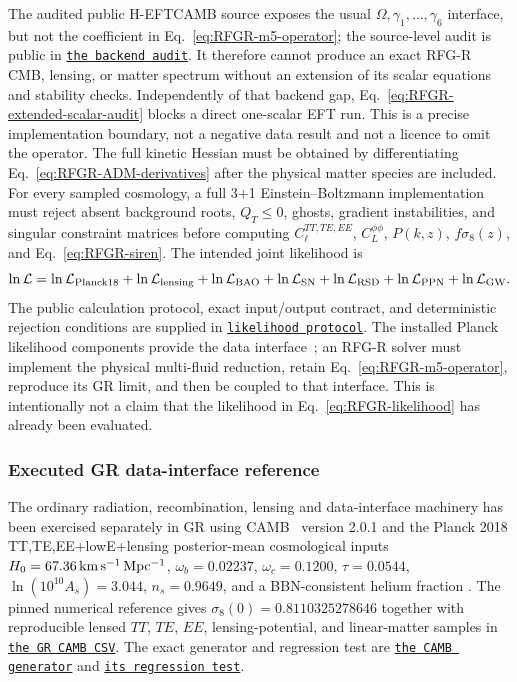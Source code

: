 \documentclass[11pt,a4paper]{article}
\newcommand{\RFGRepoURL}{https://github.com/MartinPetrasek123/MartinPetrasek123}
\newcommand{\RFGRepoNamed}[2]{\href{\RFGRepoURL/blob/main/r-universe-complete-chain/rfg-r-completion/r\_universe\_completion/#1}{\texttt{#2}}}
\begin{document}
The audited public H-EFTCAMB source exposes the usual
\(\Omega,\gamma_1,\ldots,\gamma_6\) interface, but not the coefficient in
Eq.~\eqref{eq:RFGR-m5-operator}; the source-level audit is public in
\RFGRepoNamed{docs/backend\_capability\_audit.md}{the backend audit}. It therefore
cannot produce an exact RFG-R CMB, lensing, or matter spectrum without an
extension of its scalar equations and stability checks. Independently of that backend gap,
Eq.~\eqref{eq:RFGR-extended-scalar-audit} blocks a direct one-scalar EFT run.
This is a precise implementation boundary, not a negative data result and not
a licence to omit the operator.  The full kinetic Hessian must be obtained by
differentiating Eq.~\eqref{eq:RFGR-ADM-derivatives} after the physical matter
species are included. For every sampled cosmology, a full 3+1
Einstein--Boltzmann implementation must reject absent background roots,
\(Q_T\leq0\), ghosts, gradient instabilities, and singular constraint
matrices before computing
\(C_\ell^{TT,TE,EE}\), \(C_L^{\phi\phi}\), \(P(k,z)\),
\(f\sigma_8(z)\), and Eq.~\eqref{eq:RFGR-siren}. The intended joint
likelihood is
\begin{equation}
 \ln\mathcal L=\ln\mathcal L_{\rm Planck18}
 +\ln\mathcal L_{\rm lensing}+\ln\mathcal L_{\rm BAO}
 +\ln\mathcal L_{\rm SN}+\ln\mathcal L_{\rm RSD}
 +\ln\mathcal L_{\rm PPN}+\ln\mathcal L_{\rm GW}.
 \label{eq:RFGR-likelihood}
\end{equation}
The public calculation protocol, exact input/output contract, and deterministic
rejection conditions are supplied in
\RFGRepoNamed{docs/likelihood\_pipeline.md}{likelihood protocol}.  The installed Planck likelihood
components provide the data interface~\cite{PlanckLikelihood}; an RFG-R
solver must implement the physical multi-fluid reduction, retain
Eq.~\eqref{eq:RFGR-m5-operator}, reproduce its GR limit, and then be coupled
to that interface.  This is intentionally not a claim that the likelihood in
Eq.~\eqref{eq:RFGR-likelihood} has already been evaluated.

\subsubsection{Executed GR data-interface reference}
\label{sec:gr-planck-reference}

The ordinary radiation, recombination, lensing and data-interface machinery
has been exercised separately in GR using CAMB~\cite{CAMB} version 2.0.1 and
the Planck 2018 TT,TE,EE+lowE+lensing posterior-mean cosmological inputs
\(H_0=67.36\,{\rm km\,s^{-1}\,Mpc^{-1}}\),
\(\omega_b=0.02237\), \(\omega_c=0.1200\),
\(\tau=0.0544\), \(\ln(10^{10}A_s)=3.044\), \(n_s=0.9649\), and a
BBN-consistent helium fraction
\cite{Planck}. The pinned numerical reference gives
\(\sigma_8(0)=0.8110325278646\) together with reproducible lensed
\(TT\), \(TE\), \(EE\), lensing-potential, and linear-matter samples in
\RFGRepoNamed{generated/tables/gr\_camb\_reference.csv}{the GR CAMB CSV}.
The exact generator and regression test are
\RFGRepoNamed{scripts/gr\_reference\_camb.py}{the CAMB generator} and
\RFGRepoNamed{scripts/validate\_gr\_reference\_camb.py}{its regression test}.
\end{document}
